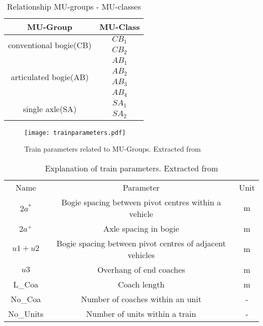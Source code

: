 \begin{appendices}
\begin{table}[h]
    \centering
    \begin{tabular}{c|c}
        \hline
        MU-Group & MU-Class\\
        \hline
        \multirow{2}{*}{conventional bogie(CB)} & $CB_1$ \\
        & $CB_2$ \\
        \hline
        \multirow{4}{*}{articulated bogie(AB)} & $AB_1$ \\
        & $AB_2$ \\
        & $AB_3$ \\
        & $AB_4$ \\
        \hline
        \multirow{2}{*}{single axle(SA)} & $SA_1$ \\
        & $SA_2$ \\
        \hline
    \end{tabular}
    \caption{Relationship MU-groups - MU-classes}
    \label{tab:MU}
\end{table} 

\begin{figure}[h]
\centering
\texttt{[image: trainparameters.pdf]}
\caption{Train parameters related to MU-Groups. Extracted from \citet[Annex C]{EC15528}}
\label{fig:trainparameters}
\end{figure}

\begin{table}[h]
    \centering
    \begin{tabular}{c|c|c}
    \hline
    Name & Parameter & Unit \\
    $2a^*$ & Bogie spacing between pivot centres within a vehicle & m \\
    $2a^+$ & Axle spacing in bogie & m \\
    $u1+u2$ & Bogie spacing between pivot centres of adjacent vehicles & m \\
    $u3$ & Overhang of end coaches & m \\
    L\_Coa & Coach length & m \\
    No\_Coa & Number of coaches within an unit & - \\
    No\_Units & Number of units within a train & - \\
    \hline
    \end{tabular}
    \caption{Explanation of train parameters. Extracted from \citet[Annex C]{EC15528}}
    \label{tab:explanationtrainparameters}
\end{table}


\end{appendices}
